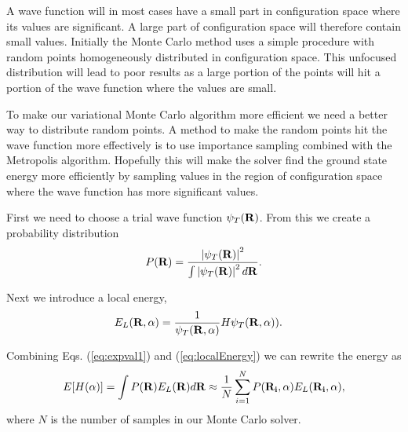		A wave function will in most cases have a small part in configuration space where its values are significant. A large part of configuration space will therefore contain small values. Initially the Monte Carlo method uses a simple procedure with random points homogeneously distributed in configuration space. This unfocused distribution will lead to poor results as a large portion of the points will hit a portion of the wave function where the values are small.

		To make our variational Monte Carlo algorithm more efficient we need a better way to distribute random points. A method to make the random points hit the wave function more effectively is to use importance sampling combined with the Metropolis algorithm. Hopefully this will make the solver find the ground state energy more efficiently by sampling values in the region of configuration space where the wave function has more significant values.

		First we need to choose a trial wave function $\psi_T (\vb{R})$. From this we create a probability distribution
		\begin{equation} \label{eq:MC_probability_dist}
			P(\vb{R})= \frac{\left|\psi_T(\vb{R})\right|^2}{\int \left|\psi_T(\vb{R})\right|^2d\vb{R}}.
		\end{equation}

		Next we introduce a local energy,
		\begin{align}\label{eq:localEnergy}
			E_L(\vb{R}, \vb{\alpha}) &= \frac{1}{ \psi_T(\vb{R}, \vb{\alpha}) } H \psi_T(\vb{R}, \vb{\alpha})).
		\end{align}

		Combining Eqs. (\ref{eq:expval1}) and (\ref{eq:localEnergy}) we can rewrite the energy as
		\[
		  E[H(\vb{\alpha})]=\int P(\vb{R})E_L(\vb{R}) d\vb{R}\approx \frac{1}{N}\sum_{i=1}^NP(\vb{R_i},\vb{\alpha})E_L(\vb{R_i},\vb{\alpha}),
		  \label{eq:vmc1}
		\]
		where $N$ is the number of samples in our Monte Carlo solver.


